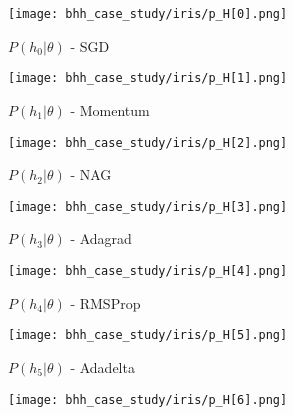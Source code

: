 \begin{figure}[htbp]
      \begin{subfigure}{0.5\textwidth}
            \centering
            \texttt{[image: bhh\_case\_study/iris/p\_H[0].png]}
            \caption{$P\left(h_{0} | \theta \right)$ - \Acs{SGD}}
            \label{fig:results:case_study:iris:p_H:0}
      \end{subfigure}
      \begin{subfigure}{0.5\textwidth}
            \centering
            \texttt{[image: bhh\_case\_study/iris/p\_H[1].png]}
            \caption{$P\left(h_{1} | \theta \right)$ - \Acs{Momentum}}
            \label{fig:results:case_study:iris:p_H:1}
      \end{subfigure}
      \par\medskip
      \begin{subfigure}{0.5\textwidth}
            \centering
            \texttt{[image: bhh\_case\_study/iris/p\_H[2].png]}
            \caption{$P\left(h_{2} | \theta \right)$ - \Acs{NAG}}
            \label{fig:results:case_study:iris:p_H:2}
      \end{subfigure}
      \begin{subfigure}{0.5\textwidth}
            \centering
            \texttt{[image: bhh\_case\_study/iris/p\_H[3].png]}
            \caption{$P\left(h_{3} | \theta \right)$ - \Acs{Adagrad}}
            \label{fig:results:case_study:iris:p_H:3}
      \end{subfigure}
      \par\medskip
      \begin{subfigure}{0.5\textwidth}
            \centering
            \texttt{[image: bhh\_case\_study/iris/p\_H[4].png]}
            \caption{$P\left(h_{4} | \theta \right)$ - \Acs{RMSProp}}
            \label{fig:results:case_study:iris:p_H:4}
      \end{subfigure}
      \begin{subfigure}{0.5\textwidth}
            \centering
            \texttt{[image: bhh\_case\_study/iris/p\_H[5].png]}
            \caption{$P\left(h_{5} | \theta \right)$ - \Acs{Adadelta}}
            \label{fig:results:case_study:iris:p_H:5}
      \end{subfigure}
      \par\medskip
      \begin{subfigure}{0.5\textwidth}
            \centering
            \texttt{[image: bhh\_case\_study/iris/p\_H[6].png]}

\end{subfigure}
\end{figure}
